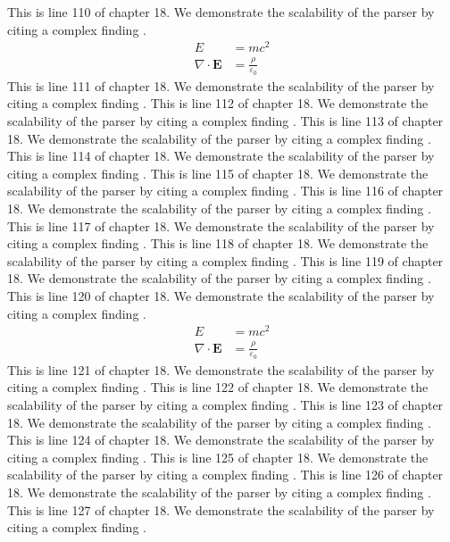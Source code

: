 This is line 110 of chapter 18. We demonstrate the scalability of the parser by citing a complex finding \cite{ref18_110}.
\begin{align*}
  E &= mc^2 \\
  \nabla \cdot \mathbf{E} &= \frac{\rho}{\varepsilon_0}
\end{align*}
This is line 111 of chapter 18. We demonstrate the scalability of the parser by citing a complex finding \cite{ref18_111}.
This is line 112 of chapter 18. We demonstrate the scalability of the parser by citing a complex finding \cite{ref18_112}.
This is line 113 of chapter 18. We demonstrate the scalability of the parser by citing a complex finding \cite{ref18_113}.
This is line 114 of chapter 18. We demonstrate the scalability of the parser by citing a complex finding \cite{ref18_114}.
This is line 115 of chapter 18. We demonstrate the scalability of the parser by citing a complex finding \cite{ref18_115}.
This is line 116 of chapter 18. We demonstrate the scalability of the parser by citing a complex finding \cite{ref18_116}.
This is line 117 of chapter 18. We demonstrate the scalability of the parser by citing a complex finding \cite{ref18_117}.
This is line 118 of chapter 18. We demonstrate the scalability of the parser by citing a complex finding \cite{ref18_118}.
This is line 119 of chapter 18. We demonstrate the scalability of the parser by citing a complex finding \cite{ref18_119}.
This is line 120 of chapter 18. We demonstrate the scalability of the parser by citing a complex finding \cite{ref18_120}.
\begin{align*}
  E &= mc^2 \\
  \nabla \cdot \mathbf{E} &= \frac{\rho}{\varepsilon_0}
\end{align*}
This is line 121 of chapter 18. We demonstrate the scalability of the parser by citing a complex finding \cite{ref18_121}.
This is line 122 of chapter 18. We demonstrate the scalability of the parser by citing a complex finding \cite{ref18_122}.
This is line 123 of chapter 18. We demonstrate the scalability of the parser by citing a complex finding \cite{ref18_123}.
This is line 124 of chapter 18. We demonstrate the scalability of the parser by citing a complex finding \cite{ref18_124}.
This is line 125 of chapter 18. We demonstrate the scalability of the parser by citing a complex finding \cite{ref18_125}.
This is line 126 of chapter 18. We demonstrate the scalability of the parser by citing a complex finding \cite{ref18_126}.
This is line 127 of chapter 18. We demonstrate the scalability of the parser by citing a complex finding \cite{ref18_127}.
